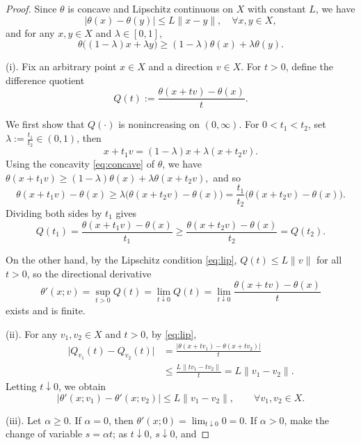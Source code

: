 \documentclass[11pt]{article}
\begin{document}
\begin{proof}
	Since $\theta$ is concave and   Lipschitz continuous on $X$ with constant $L$,  we have 
	\begin{equation}\label{eq:lip}
		|\theta(x)-\theta(y)|\le L\|x-y\|,\quad \forall x,y\in X,
	\end{equation}
	and for any $x,y\in X$ and $\lambda\in[0,1]$,
	\begin{equation}\label{eq:concave}
		\theta\bigl((1-\lambda)x+\lambda y\bigr)\ge (1-\lambda)\theta(x)+\lambda\theta(y).
	\end{equation}
	
	(i).	Fix an arbitrary point $x\in X$ and a direction $v\in X$.
	For $t>0$,  define the difference quotient
	\[
	Q(t):=\frac{\theta(x+tv)-\theta(x)}{t}.
	\]
	
	We first show that $ Q(\cdot)$ is nonincreasing on $(0,\infty)$. For $0<t_1<t_2$, set $\lambda:=\frac{t_1}{t_2}\in(0,1)$, then
	\[
	x+t_1 v = (1-\lambda)x+\lambda(x+t_2 v).
	\]
	Using the concavity \eqref{eq:concave} of $\theta$, we have 
	$	\theta(x+t_1 v) \ge (1-\lambda)\theta(x)+\lambda\theta(x+t_2 v), $
	and so
	\[
	\theta(x+t_1 v)-\theta(x) \ge \lambda\bigl(\theta(x+t_2 v)-\theta(x)\bigr)
	= \frac{t_1}{t_2}\bigl(\theta(x+t_2 v)-\theta(x)\bigr).
	\]
	Dividing both sides by $t_1$ gives
	\[
	Q(t_1) = \frac{\theta(x+t_1 v)-\theta(x)}{t_1}
	\ge \frac{\theta(x+t_2 v)-\theta(x)}{t_2} = Q(t_2).
	\]
	
	On the other hand, by the Lipschitz condition \eqref{eq:lip}, $Q(t)\le  L\|v\|$ for all $t>0$,
	so the directional derivative 
	\[
	\theta'(x;v)  =\sup_{t  > 0}Q(t) =\lim_{t\downarrow0}Q(t) =\lim_{t\downarrow0}\frac{\theta(x+t v)-\theta(x)}{t}
	\]
	exists and is finite.
	
	
	(ii).	For any $v_1,v_2\in X$ and $t>0$, by \eqref{eq:lip},
	\[
	\begin{aligned}
		\bigl|Q_{v_1}(t)-Q_{v_2}(t)\bigr|
		&= \frac{\bigl|\theta(x+t v_1)-\theta(x+t v_2)\bigr|}{t}\\
		&\le \frac{L\|t v_1-t v_2\|}{t} = L\|v_1- v_2\|.
	\end{aligned}
	\]
	Letting $t\downarrow0$, we obtain
	\[
	\bigl|\theta'(x;v_1)-\theta'(x;v_2)\bigr| \le L\|v_1- v_2\|,\qquad \forall v_1, v_2\in X.
	\]
	
	
	
	
	(iii).	Let $\alpha\ge0$. If $\alpha=0$, then $\theta'(x;0)=\lim_{t\downarrow0}0=0$. If $\alpha>0$, make the change of variable $s=\alpha t$; as $t\downarrow0$, $s\downarrow0$, and
	

\end{proof}
\end{document}
